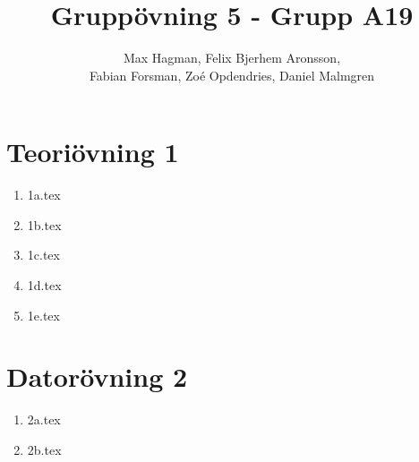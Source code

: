 \documentclass[a4paper]{report}
\title{Gruppövning 5 - Grupp A19}
\author{Max Hagman, Felix Bjerhem Aronsson,\\ Fabian Forsman, Zoé Opdendries, Daniel Malmgren}
\begin{document}
\maketitle

\section*{Teoriövning 1}
\begin{enumerate}[label=(\alph*)]
    \item {1a.tex}
    \item {1b.tex}
    \item {1c.tex}
    \item {1d.tex}
    \item {1e.tex}
\end{enumerate}
\section*{Datorövning 2}
\begin{enumerate}[label=(\alph*)]
    \item {2a.tex}
    \item {2b.tex}
\end{enumerate}
\end{document}
